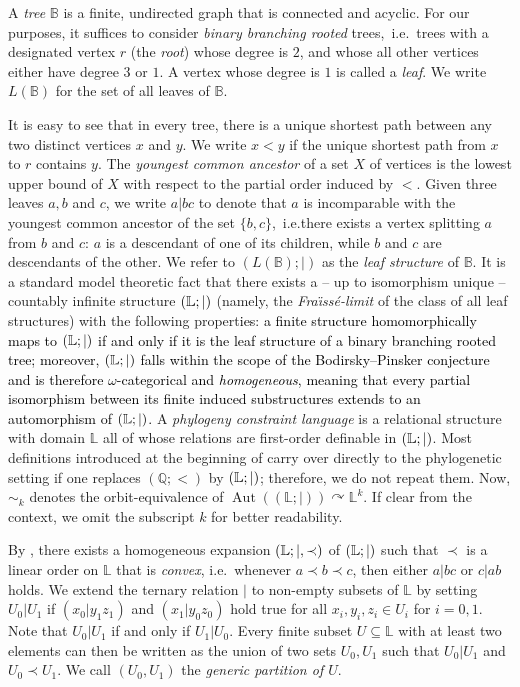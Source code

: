 \documentclass[a4paper,reqno, cleveref]{amsart}
\newcommand{\Q}{\mathbb{Q}}
\newcommand{\sTree}{\mathbb{B}}
\newcommand{\acts}{\curvearrowright}
\newcommand{\struct}[1]{\mathbb{#1}}
\DeclareMathOperator{\Aut}{Aut}
\newcommand{\sL}{\mathbb L}
\newcommand{\Phylo}[1]{\ensuremath{(\struct{L};|)}#1}
\newcommand{\Phyloconvex}[1]{\ensuremath{(\struct{L};|,\prec)}#1}
\newcommand\jo[1]{\textcolor{black}{#1}} %
\begin{document}
A \emph{tree} $\sTree$ is a finite, undirected graph that is connected and acyclic. For our purposes, it suffices to consider \emph{binary branching rooted} trees,~i.e.~trees with a designated vertex $r$ (the \emph{root}) whose degree is $2$, and whose all other vertices either have degree $3$ or $1$. A vertex whose degree is $1$ is called a \emph{leaf}. We write $L(\sTree)$ for the set of all leaves of $\sTree$.

It is easy to see that in every tree, there is a unique shortest path between any two distinct vertices $x$ and $y$. We write $x < y$ if the unique shortest path from $x$ to $r$ contains $y$.  The \emph{youngest common ancestor}  of a set $X$ of vertices  is the lowest upper bound of $X$ with respect to the partial order induced by $<$.
%
Given three leaves $a,b$ and $c$, we write $a|bc$ to denote that $a$ is incomparable with the youngest common ancestor of the set $\{b,c\}$,~i.e.\;there exists a vertex splitting $a$ from $b$ and $c$: $a$ is a descendant of one of its children, while $b$ and $c$ are descendants of the other.
%
We refer to $(L(\sTree); |)$ as the \emph{leaf structure} of $\sTree$. It is a standard model theoretic fact that there exists a -- up to isomorphism unique -- countably infinite 
structure $\Phylo$ (namely,  the \emph{Fra\"{\i}ss\'e-limit} of the class of all leaf structures) with the following propert\jo{ies}: \jo{a finite structure homomorphically maps to $\Phylo$ if and only if it is the leaf structure of a binary branching rooted tree; moreover, $\Phylo$ falls within the scope of the Bodirsky–Pinsker conjecture and is therefore $\omega$-categorical and \emph{homogeneous}, meaning that every partial isomorphism between its finite induced substructures extends to an automorphism of $\Phylo$.}  A \emph{phylogeny constraint language} is a relational structure with domain $\sL$ all of whose relations are first-order definable in $\Phylo$. Most definitions introduced at the beginning of  carry over directly to the phylogenetic setting if one replaces $(\Q;<)$ by $\Phylo$; therefore, we do not repeat them. Now, $\sim_k$ denotes the orbit-equivalence of $\Aut(\Phylo)\acts \sL^k$. If clear from the context, we  omit the subscript $k$ for better readability.

By \cite{Phylo-Complexity}, there exists a homogeneous expansion $\Phyloconvex$ of $\Phylo$ such that $\prec$ is a linear order on $\sL$ that is \emph{convex}, i.e.~whenever $a\prec b\prec c$, then either $a|bc$ or $c|ab$ holds. 
%
We extend the ternary relation $|$  to non-empty subsets of $\sL$ by setting $U_0| U_1$ if  $(x_0|y_1z_1)$ and $(x_1|y_0z_0)$ hold true for all $x_i, y_i, z_i \in U_i$ for $i=0,1$. Note that $U_0|U_1$ if and only if $U_1|U_0$.
%
Every finite subset $U\subseteq\sL$ with at least two elements can then be written as the union of two sets $U_0, U_1$ such that $U_0|U_1$
and $U_0\prec U_1$. We call $(U_0,U_1)$ the \emph{generic partition of $U$}. \\
\end{document}
